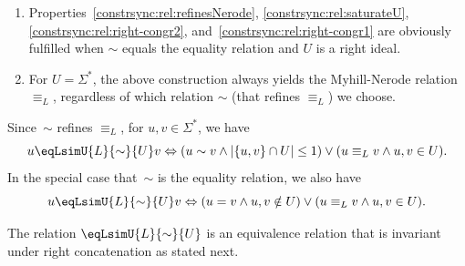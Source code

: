 \begin{example} \label{constrsync:ex:refineNerode}
	\begin{enumerate} 		
		\item  \label{constrsync:ex:refineNerode:right-ideal} Properties~\ref{constrsync:rel:refinesNerode},
		\ref{constrsync:rel:saturateU},\ref{constrsync:rel:right-congr2}, and~\ref{constrsync:rel:right-congr1}
		are obviously fulfilled when $\sim$ equals the equality relation
		and $U$ is a right ideal.
		
		
		\item For $U = \Sigma^*$, the above construction always yields
		the Myhill-Nerode relation $\equiv_L$, regardless of which relation $\sim$ (that refines $\equiv_L$) we choose.
	\end{enumerate}
\end{example}

\begin{remark} \label{constrsync:rem:refined-Nerode}
	Since~$\sim$ refines $\equiv_L$, for $u,v \in \Sigma^*$, we have
	\[
	u \eqLsimU{L}{\sim}{U} v
	\Leftrightarrow
	(  u \sim v  \land |\{u,v\} \cap U| \le 1 ) \lor
	( u \equiv_L v \land u,v \in U ).
	\]
	In the special case that~$\sim$ is the equality relation,
	we also have
	\[
	u \eqLsimU{L}{\sim}{U} v
	\Leftrightarrow
	( u = v  \land u,v \notin U ) \lor
	( u \equiv_L v \land u,v \in U ).
	\]	
\end{remark}

The relation $\eqLsimU{L}{\sim}{U}$ is an equivalence relation that is invariant under right concatenation
as stated next.

